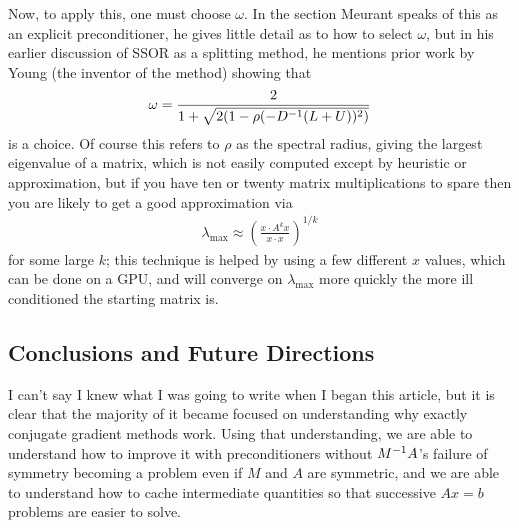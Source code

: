 \documentclass[11pt]{article}
\begin{document}
Now, to apply this, one must choose $\omega$. In the section Meurant speaks of this as an explicit preconditioner, he gives little detail as to how to select $\omega$, but in his earlier discussion of SSOR as a splitting method, he mentions prior work by Young (the inventor of the method) showing that \begin{gather*}
\omega = \frac{2}{1 + \sqrt{2(1- \rho(-D^{-1}(L + U))^2)}}
\end{gather*}
is a  choice. Of course this refers to $\rho$ as the spectral radius, giving the largest eigenvalue of a matrix, which is not easily computed except by heuristic or approximation, but if you have ten or twenty matrix multiplications to spare then you are likely to get a good approximation via \begin{gather*}
\lambda_{\text{max}} \approx \left({\frac{x \cdot A^k x}{x \cdot x}} \right)^{1/k}
\end{gather*}
for some large $k$; this technique is helped by using a few different $x$ values, which can be done on a GPU, and will converge on $\lambda_{\text{max}}$ more quickly the more ill conditioned the starting matrix is.

\subsection{Conclusions and Future Directions}

I can't say I knew what I was going to write when I began this article, but it is clear that the majority of it became focused on understanding why exactly conjugate gradient methods work. Using that understanding, we are able to understand how to improve it with preconditioners without $M^{-1} A$'s failure of symmetry becoming a problem even if $M$ and $A$ are symmetric, and we are able to understand how to cache intermediate quantities so that successive $Ax = b$ problems are easier to solve.
\end{document}
